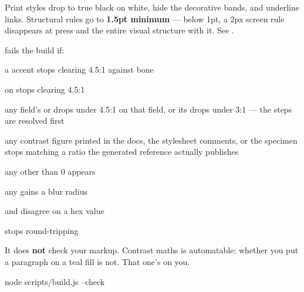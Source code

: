 \documentclass[fontpath=fonts/,logopath=logo/]{riposte-doc}
\begin{document}

Print styles drop to true black on white, hide the decorative bands, and underline links. Structural rules go to \textbf{1.5pt minimum} — below 1pt, a 2px screen rule disappears at press and the entire visual structure with it. See .



 fails the build if:

\begin{ripbullets}
\item a  accent stops clearing 4.5:1 against bone
\item {} on  stops clearing 4.5:1
\item any field's  or  drops under 4.5:1 on that field, or its  drops under 3:1 — the  steps are resolved first
\item any contrast figure printed in the docs, the stylesheet comments,  or the specimen stops matching a ratio the generated reference actually publishes
\item any  other than 0 appears
\item any  gains a blur radius
\item {} and  disagree on a hex value
\item {} stops round-tripping
\end{ripbullets}

It does \textbf{not} check your markup. Contrast maths is automatable; whether you put a paragraph on a teal fill is not. That one's on you.

\ripcodeopen
{}
\begin{ripcodeblock}
node scripts/build.js --check
\end{ripcodeblock}
\ripcodesizereset\ripcodeclose

\ripend
\end{document}
